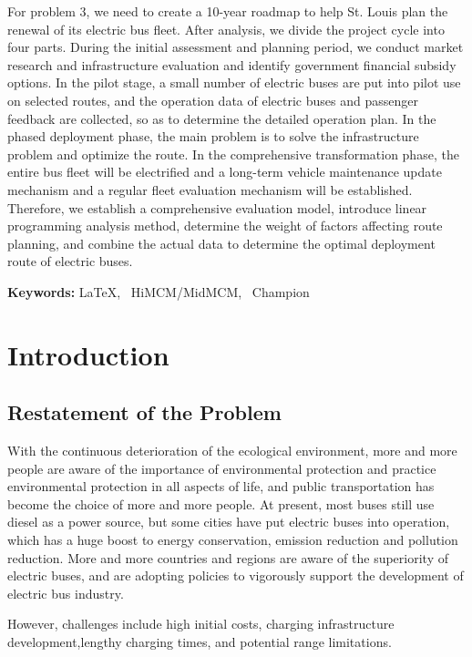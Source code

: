 \documentclass[12pt]{article}
\begin{document}
For problem 3, we need to create a 10-year roadmap to help St. Louis plan the renewal of its electric bus fleet. 
After analysis, we divide the project cycle into four parts. During the initial assessment and planning period, we conduct market 
research and infrastructure evaluation and identify government financial subsidy options. In the pilot stage, a small number of 
electric buses are put into pilot use on selected routes, and the operation data of electric buses and passenger feedback are 
collected, so as to determine the detailed operation plan. In the phased deployment phase, the main problem is to solve the 
infrastructure problem and optimize the route. In the comprehensive transformation phase, the entire bus fleet will be electrified 
and a long-term vehicle maintenance update mechanism and a regular fleet evaluation mechanism will be established. Therefore, 
we establish a comprehensive evaluation model, introduce linear programming analysis method, determine the weight of factors 
affecting route planning, and combine the actual data to determine the optimal deployment route of electric buses.


\vspace{0.4cm}
\noindent \textbf{Keywords: }\LaTeX,~  HiMCM/MidMCM,~ Champion

\newpage
\tableofcontents
\thispagestyle{empty}
\newpage

\pagestyle{fancy}
\setcounter{page}{1}
\section{Introduction}
\subsection{Restatement of the Problem}
With the continuous deterioration of the ecological environment, more and more people are aware of the importance of environmental 
protection and practice environmental protection in all aspects of life, and public transportation has become the choice of more 
and more people. At present, most buses still use diesel as a power source, but some cities have put electric buses into operation, 
which has a huge boost to energy conservation, emission reduction and pollution reduction. More and more countries and regions are 
aware of the superiority of electric buses, and are adopting policies to vigorously support the development of electric bus industry.

However, challenges include high initial costs, charging infrastructure development,lengthy charging times, and potential range 
limitations.
\end{document}
